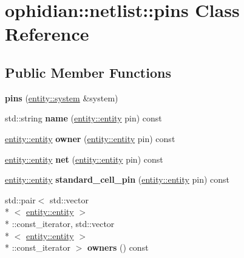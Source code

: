 \hypertarget{classophidian_1_1netlist_1_1pins}{\section{ophidian\-:\-:netlist\-:\-:pins Class Reference}
\label{classophidian_1_1netlist_1_1pins}
}
\subsection*{Public Member Functions}
\begin{DoxyCompactItemize}
\item 
\hypertarget{classophidian_1_1netlist_1_1pins_a8c887ba4e8273f11da95781d7b0de6c1}{{\bfseries pins} (\hyperlink{classophidian_1_1entity_1_1system}{entity\-::system} \&system)}\label{classophidian_1_1netlist_1_1pins_a8c887ba4e8273f11da95781d7b0de6c1}

\item 
\hypertarget{classophidian_1_1netlist_1_1pins_aa852bb0600ce9036e33bae0c4a1c9cda}{std\-::string {\bfseries name} (\hyperlink{classophidian_1_1entity_1_1entity}{entity\-::entity} pin) const }\label{classophidian_1_1netlist_1_1pins_aa852bb0600ce9036e33bae0c4a1c9cda}

\item 
\hypertarget{classophidian_1_1netlist_1_1pins_ad32d03e594a958be437f8b95af7ec4a5}{\hyperlink{classophidian_1_1entity_1_1entity}{entity\-::entity} {\bfseries owner} (\hyperlink{classophidian_1_1entity_1_1entity}{entity\-::entity} pin) const }\label{classophidian_1_1netlist_1_1pins_ad32d03e594a958be437f8b95af7ec4a5}

\item 
\hypertarget{classophidian_1_1netlist_1_1pins_aed2a0189c668af106747f42ee5dbfbb0}{\hyperlink{classophidian_1_1entity_1_1entity}{entity\-::entity} {\bfseries net} (\hyperlink{classophidian_1_1entity_1_1entity}{entity\-::entity} pin) const }\label{classophidian_1_1netlist_1_1pins_aed2a0189c668af106747f42ee5dbfbb0}

\item 
\hypertarget{classophidian_1_1netlist_1_1pins_aea13f1a3a8261133a7014522b6cdeb91}{\hyperlink{classophidian_1_1entity_1_1entity}{entity\-::entity} {\bfseries standard\-\_\-cell\-\_\-pin} (\hyperlink{classophidian_1_1entity_1_1entity}{entity\-::entity} pin) const }\label{classophidian_1_1netlist_1_1pins_aea13f1a3a8261133a7014522b6cdeb91}

\item 
\hypertarget{classophidian_1_1netlist_1_1pins_a3227273306e57f4f0687f759d5242f9d}{std\-::pair$<$ std\-::vector\\*
$<$ \hyperlink{classophidian_1_1entity_1_1entity}{entity\-::entity} $>$\\*
\-::const\-\_\-iterator, std\-::vector\\*
$<$ \hyperlink{classophidian_1_1entity_1_1entity}{entity\-::entity} $>$\\*
\-::const\-\_\-iterator $>$ {\bfseries owners} () const }\label{classophidian_1_1netlist_1_1pins_a3227273306e57f4f0687f759d5242f9d}


\end{DoxyCompactItemize}
